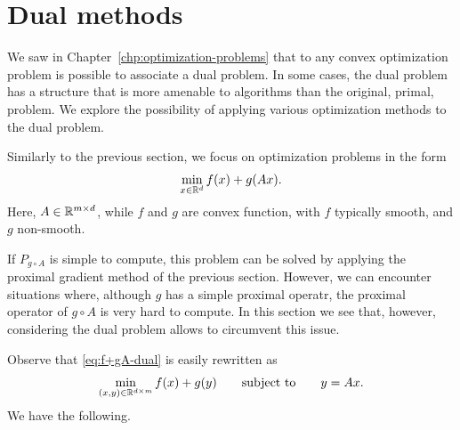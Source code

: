 \documentclass{report}
\begin{document}
\section{Dual methods}

We saw in Chapter~\ref{chp:optimization-problems} that to any convex optimization problem is possible to associate a dual problem.
In some cases, the dual problem has a structure that is more amenable to algorithms than the original, primal, problem. We explore the possibility of applying various optimization methods to the dual problem.

Similarly to the previous section, we focus on optimization problems in the form
\begin{equation}
	\label{eq:f+gA-dual}
	\min_{x\in\mathbb{R}^d} f(x) + g(Ax).
\end{equation}
Here,  $A\in \mathbb{R}^{m\times d}$, while $f$ and $g$ are convex function, with $f$ typically smooth, and $g$ non-smooth.

If $P_{g\circ A}$ is simple to compute, this problem can be solved by applying the proximal gradient method of the previous section. 
However, we can encounter situations where, although $g$ has a simple proximal operatr, the proximal operator of ${g\circ A}$ is very hard to compute.
In this section we see that, however, considering the dual problem allows to circumvent this issue.


Observe that \eqref{eq:f+gA-dual} is easily rewritten as 
\begin{equation}
	\label{eq:f+g+A-dual}
	\min_{(x,y)\in\mathbb{R}^{d\times m}} f(x) + g(y) 
	\qquad\text{subject to}\qquad 
	y = Ax.
\end{equation}
We have the following.
\end{document}
